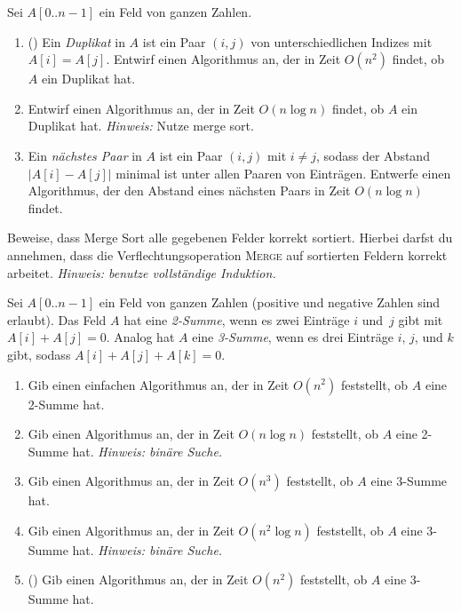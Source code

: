 \documentclass{uebung_cs}
\begin{document}
\begin{aufgabe}
	Sei $A[0..n-1]$ ein Feld von ganzen Zahlen.
	\begin{enumerate}
		\item (\warmup) Ein \emph{Duplikat} in $A$ ist ein Paar $(i,j)$ von unterschiedlichen Indizes mit $A[i]=A[j]$. Entwirf einen Algorithmus an, der in Zeit $O(n^2)$ findet, ob $A$ ein Duplikat hat.
		\item Entwirf einen Algorithmus an, der in Zeit $O(n\log n)$ findet, ob $A$ ein Duplikat hat. \emph{Hinweis:} Nutze merge sort.
		\item Ein \emph{nächstes Paar} in $A$ ist ein Paar $(i,j)$ mit $i\ne j$, sodass der Abstand $|A[i]-A[j]|$ minimal ist unter allen Paaren von Einträgen.
		Entwerfe einen Algorithmus, der den Abstand eines nächsten Paars in Zeit $O(n\log n)$ findet.
	\end{enumerate}
\end{aufgabe}

\begin{aufgabe}
	Beweise, dass Merge Sort alle gegebenen Felder korrekt sortiert. Hierbei darfst du annehmen, dass die Verflechtungsoperation \textsc{Merge} auf sortierten Feldern korrekt arbeitet.
	\emph{Hinweis: benutze vollständige Induktion.}
\end{aufgabe}

\begin{aufgabe}
	Sei $A[0..n-1]$ ein Feld von ganzen Zahlen (positive und negative Zahlen sind erlaubt).
	Das Feld $A$ hat eine \emph{2-Summe}, wenn es zwei Einträge $i$ und~$j$ gibt mit $A[i]+A[j]=0$.
	Analog hat $A$ eine \emph{3-Summe}, wenn es drei Einträge $i$, $j$, und $k$ gibt, sodass $A[i]+A[j]+A[k]=0$.
	\begin{enumerate}
		\item \bestehen %
    Gib einen einfachen Algorithmus an, der in Zeit $O(n^2)$ feststellt, ob $A$ eine 2-Summe hat.
		\item \mittel Gib einen Algorithmus an, der in Zeit $O(n\log n)$ feststellt, ob $A$ eine 2-Summe hat. \emph{Hinweis: binäre Suche.}
		\item \bestehen %
    Gib einen Algorithmus an, der in Zeit $O(n^3)$ feststellt, ob $A$ eine 3-Summe hat.
		\item \mittel Gib einen Algorithmus an, der in Zeit $O(n^2\log n)$ feststellt, ob $A$ eine 3-Summe hat. \emph{Hinweis: binäre Suche.}
		\item \note (\veryhard) Gib einen Algorithmus an, der in Zeit $O(n^2)$ feststellt, ob $A$ eine 3-Summe hat.
	\end{enumerate}
\end{aufgabe}
\end{document}
